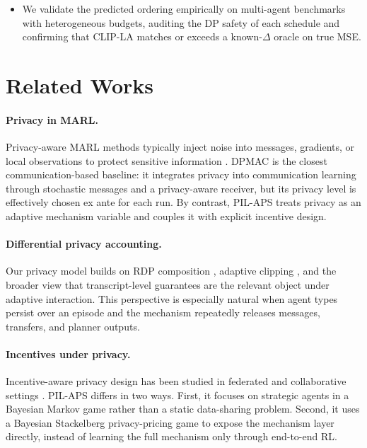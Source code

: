 \documentclass{article}
\begin{document}
\begin{itemize}
    \item We validate the predicted ordering empirically on multi-agent benchmarks with heterogeneous budgets, auditing the DP safety of each schedule and confirming that CLIP-LA matches or exceeds a known-$\Delta$ oracle on true MSE.
    
\end{itemize}

\section{Related Works}
\label{sec:rlt_work}
\paragraph{Privacy in MARL.}
Privacy-aware MARL methods typically inject noise into messages, gradients, or local observations to protect sensitive information \citep{zhao2023dpmac,ahmed2024privacy,chen2023differential}. DPMAC \citep{zhao2023dpmac} is the closest communication-based baseline: it integrates privacy into communication learning through stochastic messages and a privacy-aware receiver, but its privacy level is effectively chosen ex ante for each run. By contrast, PIL-APS treats privacy as an adaptive mechanism variable and couples it with explicit incentive design.

\paragraph{Differential privacy accounting.}
Our privacy model builds on RDP composition \citep{8049725,dwork2025differentially}, adaptive clipping \citep{andrew2021differentially}, and the broader view that transcript-level guarantees are the relevant object under adaptive interaction. This perspective is especially natural when agent types persist over an episode and the mechanism repeatedly releases messages, transfers, and planner outputs.

\paragraph{Incentives under privacy.}
Incentive-aware privacy design has been studied in federated and collaborative settings \citep{wu2021incentivizing,sim2023incentives}. PIL-APS differs in two ways. First, it focuses on strategic agents in a Bayesian Markov game rather than a static data-sharing problem. Second, it uses a Bayesian Stackelberg privacy-pricing game to expose the mechanism layer directly, instead of learning the full mechanism only through end-to-end RL.
\end{document}
